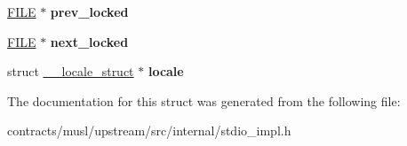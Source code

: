 \begin{DoxyCompactItemize}
\mbox{\hyperlink{struct___i_o___f_i_l_e}{F\+I\+LE}} $\ast$ {\bfseries prev\+\_\+locked}
\item 
\mbox{\label{struct___i_o___f_i_l_e_a5a69eefd423a77391f9867a45f7a4981}} 
\mbox{\hyperlink{struct___i_o___f_i_l_e}{F\+I\+LE}} $\ast$ {\bfseries next\+\_\+locked}
\item 
\mbox{\label{struct___i_o___f_i_l_e_a48bc55c20938971b4ffb40e682e48d12}} 
struct \mbox{\hyperlink{struct____locale__struct}{\+\_\+\+\_\+locale\+\_\+struct}} $\ast$ {\bfseries locale}
\end{DoxyCompactItemize}


The documentation for this struct was generated from the following file\+:\begin{DoxyCompactItemize}
\item 
contracts/musl/upstream/src/internal/stdio\+\_\+impl.\+h\end{DoxyCompactItemize}
